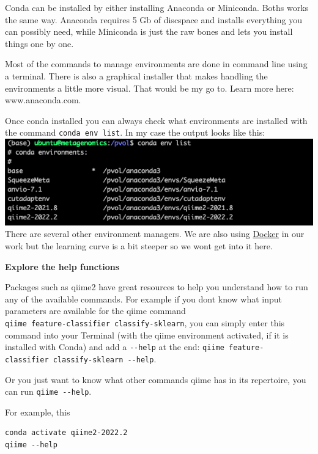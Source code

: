 \documentclass[
]{book}
\begin{document}
Conda can be installed by either installing Anaconda or Miniconda. Boths works the same way. Anaconda requires 5 Gb of discspace and installs everything you can possibly need, while Miniconda is just the raw bones and lets you install things one by one.

Most of the commands to manage environments are done in command line using a terminal. There is also a graphical installer that makes handling the environments a little more visual. That would be my go to. Learn more here: www.anaconda.com.

Once conda installed you can always check what environments are installed with the command \texttt{conda\ env\ list}. In my case the output looks like this:\\
\includegraphics{./img/condaenvs.png}\\

There are several other environment managers. We are also using \href{https://www.docker.com/}{Docker} in our work but the learning curve is a bit steeper so we wont get into it here.

\textbf{Explore the help functions}

Packages such as qiime2 have great resources to help you understand how to run any of the available commands. For example if you dont know what input parameters are available for the qiime command\\
\texttt{qiime\ feature-classifier\ classify-sklearn}, you can simply enter this command into your Terminal (with the qiime environment activated, if it is installed with Conda) and add a \texttt{-\/-help} at the end: \texttt{qiime\ feature-classifier\ classify-sklearn\ -\/-help}.

Or you just want to know what other commands qiime has in its repertoire, you can run \texttt{qiime\ -\/-help}.

For example, this

\begin{verbatim}
conda activate qiime2-2022.2  
qiime --help  
\end{verbatim}
\end{document}
